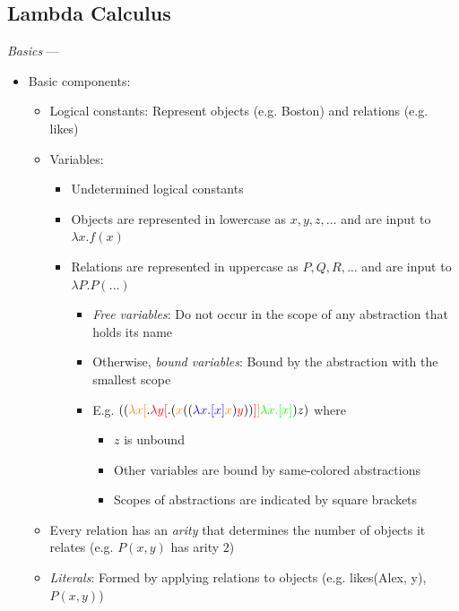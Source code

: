\subsection*{Lambda Calculus}
\emph{Basics} ---
\begin{itemize}
    \item Basic components:
    \begin{itemize}
        \item Logical constants: Represent objects (e.g. Boston) and relations (e.g. likes)
        \item Variables:
        \begin{itemize}
            \item Undetermined logical constants
            \item Objects are represented in lowercase as $x, y, z, \dots$ and are input to $\lambda x.f(x)$
            \item Relations are represented in uppercase as $P, Q, R, \dots$ and are input to $\lambda P.P(\dots)$
            \begin{itemize}
                \item \emph{Free variables}: Do not occur in the scope of any abstraction that holds its name
                \item Otherwise, \emph{bound variables}: Bound by the abstraction with the smallest scope
                \item E.g. $((\textcolor{orange}{\lambda x[}.\textcolor{red}{\lambda y[}.(\textcolor{orange}{x} ((\textcolor{blue}{\lambda x.[x]} \textcolor{orange}{x}) \textcolor{red}{y}))\textcolor{red}{]}\textcolor{orange}{]} \textcolor{green}{\lambda x.[x]}) z)$ where
                \begin{itemize}
                    \item $z$ is unbound
                    \item Other variables are bound by same-colored abstractions
                    \item Scopes of abstractions are indicated by square brackets
                \end{itemize}
            \end{itemize}
        \end{itemize}
        \item Every relation has an \emph{arity} that determines the number of objects it relates (e.g. $P(x, y)$ has arity $2$)
        \item \emph{Literals}: Formed by applying relations to objects (e.g. likes(Alex, y), $P(x, y)$)

\end{itemize}
\end{itemize}
